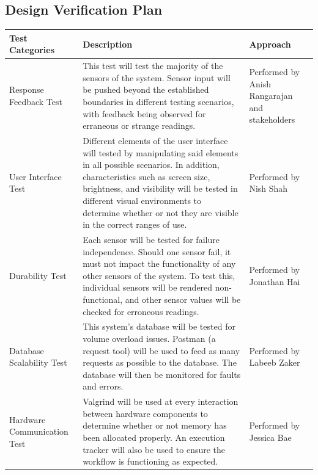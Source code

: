 \documentclass[12pt, titlepage]{article}
\begin{document}
\subsection{Design Verification Plan}
\begin{tabular}{|p{4cm}|p{8cm}|p{4cm}|}
  \hline
  \label{sec_4_3}\textbf{Test Categories} & \textbf{Description}                                                                                                                                                                                                                                                                                                 & \textbf{Approach}                      \\
  \hline
  Response Feedback Test                  & This test will test the majority of the sensors of the system. Sensor input will be pushed beyond the established boundaries in different testing scenarios, with feedback being observed for erraneous or strange readings.
 & Performed by \newline Anish Rangarajan and stakeholders\\
  \hline
  User Interface Test                     & Different elements of the user interface will tested by manipulating said elements in all possible scenarios. In addition, characteristics such as screen size, brightness, and visibility will be tested in different visual environments to determine whether or not they are visible in the correct ranges of use.                                                                                                              & Performed by \newline Nish Shah                \\
  \hline
  Durability Test                         & Each sensor will be tested for failure independence. Should one sensor fail, it must not impact the functionality of any other sensors of the system. To test this, individual sensors will be rendered non-functional, and other sensor values will be checked for erroneous readings.                                                                         & Performed by Jonathan Hai                \\
  \hline
  Database Scalability Test               & This system's database will be tested for volume overload issues. Postman (a request tool) will be used to feed as many requests as possible to the database. The database will then be monitored for faults and errors. & Performed by \newline Labeeb Zaker                \\
  \hline
  Hardware \newline Communication Test                & Valgrind will be used at every interaction between hardware components to determine whether or not memory has been allocated properly. An execution tracker will also be used to ensure the workflow is functioning as expected.                                                                                                          & Performed by \newline Jessica Bae                \\
  \hline
\end{tabular}
\end{document}

